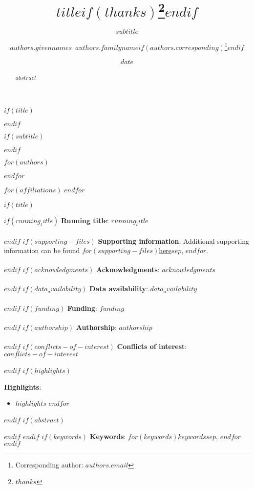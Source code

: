 \documentclass[11pt]{article}
\begin{document}
$if(title)$
\title{$title$$if(thanks)$\thanks{$thanks$}$endif$}
$endif$

$if(subtitle)$
\subtitle{$subtitle$}
$endif$

$for(authors)$
\author[$for(authors.affiliations)$$authors.affiliations$$sep$,$endfor$]{$authors.givennames$~$authors.familyname$$if(authors.corresponding)$\thanks{Corresponding author: $authors.email$}$endif$}
$endfor$

$for(affiliations)$
$endfor$

\date{$date$}

$if(title)$
\maketitle
$if(running_title)$
\small{{\bf Running title}: $running_title$}\\\\
$endif$
$if(supporting-files)$
\small{{\bf Supporting information}: Additional supporting information can be found $for(supporting-files)$\href{https://willvieira.github.io/ms_STM-managed/$supporting-files$.pdf}{here}$sep$, $endfor$.}\\\\
$endif$
$if(acknowledgments)$
\small{{\bf Acknowledgments}: $acknowledgments$}\\\\
$endif$
$if(data_availability)$
\small{{\bf Data availability}: $data_availability$}\\\\
$endif$
$if(funding)$
\small{{\bf Funding}: $funding$}\\\\
$endif$
$if(authorship)$
\small{{\bf Authorship}: $authorship$}\\\\
$endif$
$if(conflicts-of-interest)$
\small{{\bf Conflicts of interest}: $conflicts-of-interest$}\\\\
$endif$
$if(highlights)$
\small{{\bf Highlights}:\vspace{-1.5em}
\begin{itemize}
  $for(highlights)$
    \item $highlights$
  $endfor$
\end{itemize}}
$endif$
$if(abstract)$
\begin{abstract}
$abstract$
\end{abstract}
$endif$
$endif$
$if(keywords)$
\hspace{1cm}\small{{\bf Keywords}: $for(keywords)$$keywords$$sep$, $endfor$}
$endif$
\end{document}
